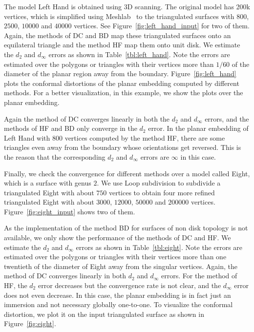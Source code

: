 \documentclass[11pt]{article}
\begin{document}
\vspace{0.3in}
The model Left Hand is obtained using 3D scanning. The original model has 200k vertices, which 
is simplified using Meshlab~\cite{meshlab} to the triangulated surfaces with $800$, 
$2500$, $10000$ and $40000$ vertices. See Figure~\ref{fig:left_hand_input} for two of them. 
Again, the methods of DC and BD map these triangulated surfaces onto an equilateral triangle 
and the method HF map them onto unit disk. We estimate the $d_2$ and $d_\infty$ errors as 
shown in Table~\ref{tbl:left_hand}. Note the errors are estimated over the 
polygons or triangles with their vertices more than $1/60$ of the diameter
of the planar region away from the boundary. Figure~\ref{fig:left_hand} plots the conformal
distortions of the planar embedding computed by different methods. For a better visualization, 
in this example, we show the plots over the planar embedding. 

Again the method of DC converges linearly in both the $d_2$ and $d_\infty$ errors, and the methods 
of HF and BD only converge in the $d_2$ error. In the planar embedding of Left Hand with $800$ 
vertices computed by the method HF, there are some triangles even away from the boundary whose orientations 
get reversed. This is the reason that the corresponding $d_2$ and $d_\infty$ errors are $\infty$
in this case.






\vspace{0.1in}
Finally, we check the convergence for different methods over a model called Eight, which is a 
surface with genus $2$. We use Loop subdivision to subdivide a triangulated Eight with about $750$ 
vertices to obtain four more refined triangulated Eight with about $3000$, $12000$, $50000$ and $200000$ vertices. 
Figure~\ref{fig:eight_input} shows two of them. 

As the implementation of the method BD for surfaces of non disk topology is not available, we only 
show the performance of the methods of DC and HF. 
We estimate the $d_2$ and $d_\infty$ errors as shown in Table~\ref{tbl:eight}. Note the errors are
estimated over the polygons or triangles with their vertices more than one twentieth of the diameter
of Eight away from the singular vertices. 
Again, the method of DC converges linearly in both $d_2$ and $d_\infty$ errors. 
For the method of HF, the $d_2$ error decreases but the convergence rate is not clear, 
and the $d_\infty$ error does not even decrease. 
In this case, the planar embedding is in fact just an immersion and not necessary globally one-to-one. 
To visualize the conformal distortion, we plot it on the input triangulated surface as shown in Figure~\ref{fig:eight}.
\end{document}
